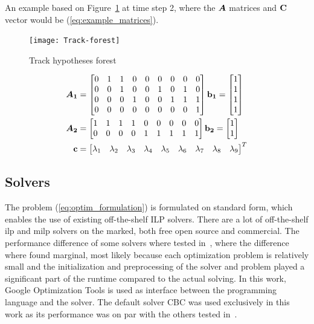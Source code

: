 An example based on Figure~\ref{fig:hyp_forest} at time step 2, where the \(\bm{A}\) matrices and \(\boldsymbol{\mathbf{C}}\) vector would be (\ref{eq:example_matrices}).
\begin{figure}[H]
\centering
\texttt{[image: Track-forest]}
\caption{Track hypotheses forest}\label{fig:hyp_forest}
\end{figure}

\begin{equation}
\begin{split}
\bm{A_1} &=\begin{bmatrix}
		0 & 1 & 1 & 0 & 0 & 0 & 0 & 0 & 0 \\
       	0 & 0 & 1 & 0 & 0 & 1 & 0 & 1 & 0 \\
       	0 & 0 & 0 & 1 & 0 & 0 & 1 & 1 & 1 \\
       	0 & 0 & 0 & 0 & 0 & 0 & 0 & 0 & 1 \\
     	\end{bmatrix}
\boldsymbol{\mathbf{b_1}} = 	\begin{bmatrix}
			1 \\ 1  \\ 1 \\ 1
			\end{bmatrix} \\
\bm{A_2} &=\begin{bmatrix}
		1 & 1 & 1 & 1 & 0 & 0 & 0 & 0 & 0 \\
       	0 & 0 & 0 & 0 & 1 & 1 & 1 & 1 & 1 \\
     	\end{bmatrix} 
\boldsymbol{\mathbf{b_2}} = 	\begin{bmatrix}
			1 \\ 1
			\end{bmatrix} \\
\boldsymbol{\mathbf{c}} &=\begin{bmatrix}
		\lambda_1 & \lambda_2 & \lambda_3 & \lambda_4 & \lambda_5 & \lambda_6 & \lambda_7 & \lambda_8 & \lambda_9
		\end{bmatrix}^T \\
\end{split}
\label{eq:example_matrices}
\end{equation}

\subsection{Solvers}
The problem (\ref{eq:optim_formulation}) is formulated on standard form, which enables the use of existing off-the-shelf ILP solvers. There are a lot of off-the-shelf \gls{ilp} and \gls{milp} solvers on the marked, both free open source and commercial. The performance difference of some solvers where tested in~\cite{Liland_2017}, where the difference where found marginal,  most likely because each optimization problem is relatively small and the initialization and preprocessing of the solver and problem played a significant part of the runtime compared to the actual solving. In this work, Google Optimization Tools is used as interface between the programming language and the solver. The default solver CBC was used exclusively in this work as its performance was on par with the others tested in~\cite{Liland_2017}. 

